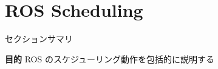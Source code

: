 
\section{ROS Scheduling}
\label{sec: ros scheduling}


\begin{frame}{セクションサマリ}
    \begin{itembox}[l]{\textbf{目的}}
        ROS のスケジューリング動作を包括的に説明する
    \end{itembox}
\end{frame}





